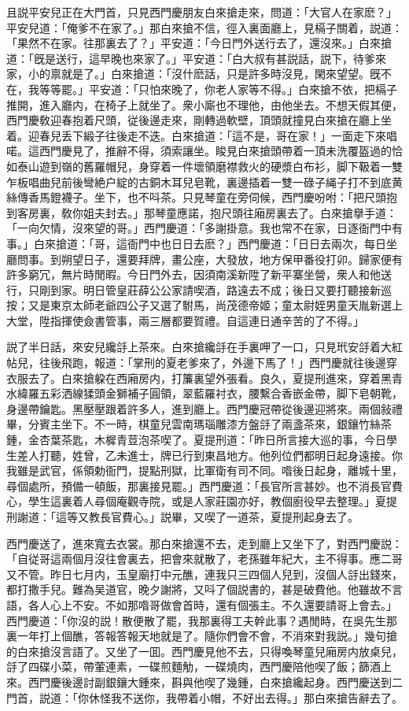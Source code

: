 且説平安兒正在大門首，只見西門慶朋友白來搶走來，問道：「大官人在家麽？」平安兒道：「俺爹不在家了。」那白來搶不信，徑入裏面廳上，見槅子關着，説道：「果然不在家。往那裏去了？」平安道：「今日門外送行去了，還沒來。」白來搶道：「旣是送行，這早晚也來家了。」平安道：「白大叔有甚説話，説下，待爹來家，小的禀就是了。」白來搶道：「沒什麽話，只是許多時沒見，閑來望望。旣不在，我等等罷。」平安道：「只怕來晚了，你老人家等不得。」白來搶不依，把槅子推開，進入廳内，在椅子上就坐了。衆小廝也不理他，由他坐去。不想天假其便，西門慶敎迎春抱着尺頭，従後邊走來，剛轉過軟壁，頂頭就撞見白來搶在廳上坐着。迎春兒丢下緞子往後走不迭。白來搶道：「這不是，哥在家！」一面走下來唱喏。這西門慶見了，推辭不得，須索讓坐。睃見白來搶頭帶着一頂未洗覆盔過的恰如泰山遊到嶺的舊羅帽兒，身穿着一件壞領磨襟救火的硬漿白布衫，脚下靸着一雙乍板唱曲兒前後彎絶户綻的古銅木耳兒皂靴，裏邊插着一雙一碌子䋲子打不到底黄絲傳香馬鐙襪子。坐下，也不呌茶。只見琴童在旁伺候，西門慶吩咐：「把尺頭抱到客房裏，敎你姐夫封去。」那琴童應諾，抱尺頭往廂房裏去了。白來搶擧手道：「一向欠情，沒來望的哥。」西門慶道：「多謝掛意。我也常不在家，日逐衙門中有事。」白來搶道：「哥，這衙門中也日日去麽？」西門慶道：「日日去兩次，每日坐廳問事。到朔望日子，還要拜牌，畫公座，大發放，地方保甲番役打卯。歸家便有許多窮冗，無片時閒暇。今日門外去，因須南溪新陞了新平寨坐營，衆人和他送行，只剛到家。明日管皇莊薛公公家請喫酒，路遠去不成；後日又要打聽接新巡按；又是東京太師老爺四公子又選了駙馬，尚茂德帝姬；童太尉姪男童天胤新選上大堂，陞指揮使僉書管事，兩三層都要賀禮。自這連日通辛苦的了不得。」

説了半日話，來安兒纔㧱上茶來。白來搶纔㧱在手裏呷了一口，只見玳安㧱着大紅帖兒，往後飛跑，報道：「掌刑的夏老爹來了，外邊下馬了！」西門慶就往後邊穿衣服去了。白來搶躱在西廂房内，打簾裏望外張看。良久，夏提刑進來，穿着黑青水緯羅五彩洒線猱頭金獅補子圓領，翠藍羅衬衣，腰繫合香嵌金帶，脚下皂朝靴，身邊帶鑰匙。黑壓壓跟着許多人，進到廳上。西門慶冠帶從後邊迎將來。兩個敍禮畢，分賓主坐下。不一時，棋童兒雲南瑪瑙雕漆方盤㧱了兩盞茶來，銀鑲竹絲茶鍾，金杏葉茶匙，木樨青荳泡茶喫了。夏提刑道：「昨日所言接大巡的事，今日學生差人打聽，姓曾，乙未進士，牌已行到東昌地方。他列位們都明日起身遠接。你我雖是武官，係領勅衙門，提點刑獄，比軍衛有司不同。喒後日起身，離城十里，尋個處所，預備一頓飯，那裏接見罷。」西門慶道：「長官所言甚妙。也不消長官費心，學生這裏着人尋個庵觀寺院，或是人家莊園亦好，教個廚役早去整理。」夏提刑謝道：「這等又教長官費心。」説畢，又喫了一道茶，夏提刑起身去了。

西門慶送了，進來寬去衣裳。那白來搶還不去，走到廳上又坐下了，對西門慶説：「自従哥這兩個月沒往會裏去，把會來就散了，老孫雖年紀大，主不得事。應二哥又不管。昨日七月内，玉皇廟打中元醮，連我只三四個人兒到，沒個人㧱出錢來，都打撒手兒。難為吴道官，晚夕謝將，又呌了個説書的，甚是破費他。他雖故不言語，各人心上不安。不如那喒哥做會首時，還有個張主。不久還要請哥上會去。」西門慶道：「你沒的説！散便散了罷，我那裏得工夫幹此事？遇閒時，在吳先生那裏一年打上個醮，答報答報天地就是了。隨你們會不會，不消來對我説。」幾句搶的白來搶沒言語了。又坐了一囬。西門慶見他不去，只得喚琴童兒廂房内放桌兒，㧱了四碟小菜，帶葷連素，一碟煎麵觔，一碟燒肉，西門慶陪他喫了飯；篩酒上來。西門慶後邊討副銀鑲大鍾來，斟與他喫了幾鍾，白來搶纔起身。西門慶送到二門首，説道：「你休怪我不送你，我帶着小帽，不好出去得。」那白來搶告辭去了。

